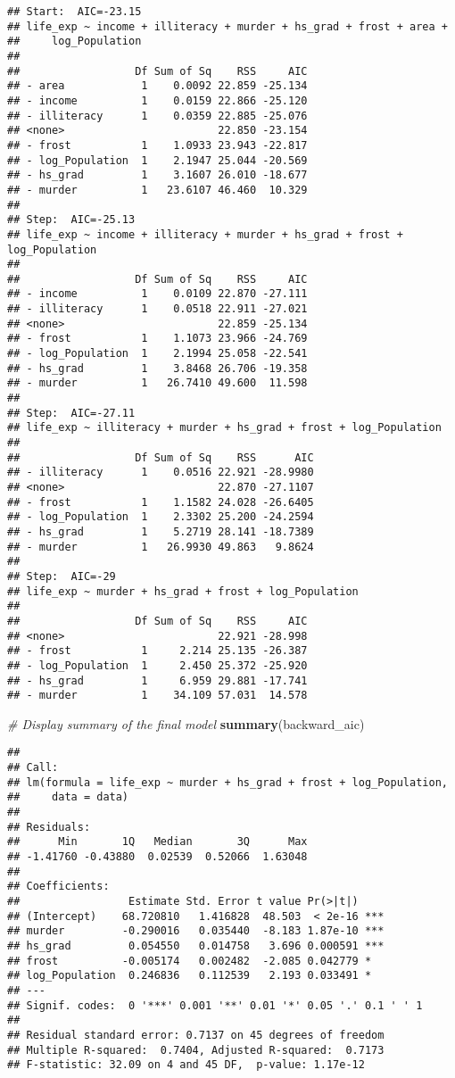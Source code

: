 \documentclass[
]{article}
\newenvironment{Shaded}{\begin{snugshade}}{\end{snugshade}}
\newcommand{\CommentTok}[1]{\textcolor[rgb]{0.56,0.35,0.01}{\textit{#1}}}
\newcommand{\FunctionTok}[1]{\textcolor[rgb]{0.13,0.29,0.53}{\textbf{#1}}}
\newcommand{\NormalTok}[1]{#1}
\begin{document}
\begin{verbatim}
## Start:  AIC=-23.15
## life_exp ~ income + illiteracy + murder + hs_grad + frost + area + 
##     log_Population
## 
##                  Df Sum of Sq    RSS     AIC
## - area            1    0.0092 22.859 -25.134
## - income          1    0.0159 22.866 -25.120
## - illiteracy      1    0.0359 22.885 -25.076
## <none>                        22.850 -23.154
## - frost           1    1.0933 23.943 -22.817
## - log_Population  1    2.1947 25.044 -20.569
## - hs_grad         1    3.1607 26.010 -18.677
## - murder          1   23.6107 46.460  10.329
## 
## Step:  AIC=-25.13
## life_exp ~ income + illiteracy + murder + hs_grad + frost + log_Population
## 
##                  Df Sum of Sq    RSS     AIC
## - income          1    0.0109 22.870 -27.111
## - illiteracy      1    0.0518 22.911 -27.021
## <none>                        22.859 -25.134
## - frost           1    1.1073 23.966 -24.769
## - log_Population  1    2.1994 25.058 -22.541
## - hs_grad         1    3.8468 26.706 -19.358
## - murder          1   26.7410 49.600  11.598
## 
## Step:  AIC=-27.11
## life_exp ~ illiteracy + murder + hs_grad + frost + log_Population
## 
##                  Df Sum of Sq    RSS      AIC
## - illiteracy      1    0.0516 22.921 -28.9980
## <none>                        22.870 -27.1107
## - frost           1    1.1582 24.028 -26.6405
## - log_Population  1    2.3302 25.200 -24.2594
## - hs_grad         1    5.2719 28.141 -18.7389
## - murder          1   26.9930 49.863   9.8624
## 
## Step:  AIC=-29
## life_exp ~ murder + hs_grad + frost + log_Population
## 
##                  Df Sum of Sq    RSS     AIC
## <none>                        22.921 -28.998
## - frost           1     2.214 25.135 -26.387
## - log_Population  1     2.450 25.372 -25.920
## - hs_grad         1     6.959 29.881 -17.741
## - murder          1    34.109 57.031  14.578
\end{verbatim}

\begin{Shaded}
\begin{Highlighting}[]
\CommentTok{\# Display summary of the final model}
\FunctionTok{summary}\NormalTok{(backward\_aic)}
\end{Highlighting}
\end{Shaded}

\begin{verbatim}
## 
## Call:
## lm(formula = life_exp ~ murder + hs_grad + frost + log_Population, 
##     data = data)
## 
## Residuals:
##      Min       1Q   Median       3Q      Max 
## -1.41760 -0.43880  0.02539  0.52066  1.63048 
## 
## Coefficients:
##                 Estimate Std. Error t value Pr(>|t|)    
## (Intercept)    68.720810   1.416828  48.503  < 2e-16 ***
## murder         -0.290016   0.035440  -8.183 1.87e-10 ***
## hs_grad         0.054550   0.014758   3.696 0.000591 ***
## frost          -0.005174   0.002482  -2.085 0.042779 *  
## log_Population  0.246836   0.112539   2.193 0.033491 *  
## ---
## Signif. codes:  0 '***' 0.001 '**' 0.01 '*' 0.05 '.' 0.1 ' ' 1
## 
## Residual standard error: 0.7137 on 45 degrees of freedom
## Multiple R-squared:  0.7404, Adjusted R-squared:  0.7173 
## F-statistic: 32.09 on 4 and 45 DF,  p-value: 1.17e-12
\end{verbatim}
\end{document}
